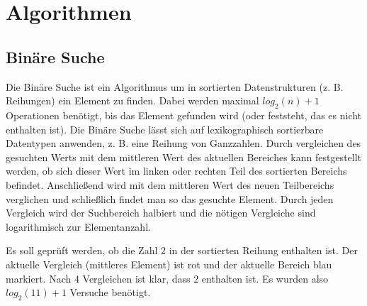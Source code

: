 \section{Algorithmen}

\subsection{Binäre Suche}

Die Binäre Suche ist ein Algorithmus um in sortierten Datenstrukturen (z. B. Reihungen)
ein Element zu finden. Dabei werden maximal $log_{2}(n) + 1$ Operationen benötigt,
bis das Element gefunden wird (oder feststeht, das es nicht enthalten ist).
Die Binäre Suche lässt sich auf lexikographisch sortierbare Datentypen anwenden,
z. B. eine Reihung von Ganzzahlen. Durch vergleichen des gesuchten Werts mit dem mittleren
Wert des aktuellen Bereiches kann festgestellt werden, ob sich dieser Wert im linken oder
rechten Teil des sortierten Bereichs befindet. Anschließend wird mit dem mittleren Wert
des neuen Teilbereichs verglichen und schließlich findet man so das gesuchte Element.
Durch jeden Vergleich wird der Suchbereich halbiert und die nötigen Vergleiche sind
logarithmisch zur Elementanzahl.

\vspace*{0.3cm}
Es soll geprüft werden, ob die Zahl 2 in der sortierten Reihung enthalten ist.
Der aktuelle Vergleich (mittleres Element) ist rot und der aktuelle Bereich blau markiert.
Nach 4 Vergleichen ist klar, dass 2 enthalten ist. 
Es wurden also $log_{2}(11) + 1$ Versuche benötigt.


%
%


